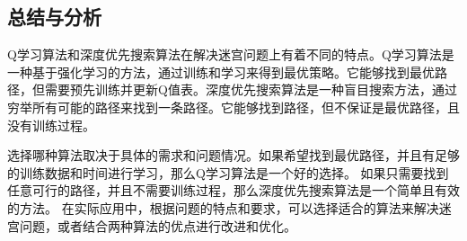\documentclass[UTF8,titlepage]{ctexart}
\numberwithin{figure}{section}
\begin{document}
\subsection{总结与分析}
Q学习算法和深度优先搜索算法在解决迷宫问题上有着不同的特点。Q学习算法是一种基于强化学习的方法，通过训练和学习来得到最优策略。它能够找到最优路径，但需要预先训练并更新Q值表。深度优先搜索算法是一种盲目搜索方法，通过穷举所有可能的路径来找到一条路径。它能够找到路径，但不保证是最优路径，且没有训练过程。

选择哪种算法取决于具体的需求和问题情况。如果希望找到最优路径，并且有足够的训练数据和时间进行学习，那么Q学习算法是一个好的选择。
如果只需要找到任意可行的路径，并且不需要训练过程，那么深度优先搜索算法是一个简单且有效的方法。
在实际应用中，根据问题的特点和要求，可以选择适合的算法来解决迷宫问题，或者结合两种算法的优点进行改进和优化。

\clearpage
\end{document}
